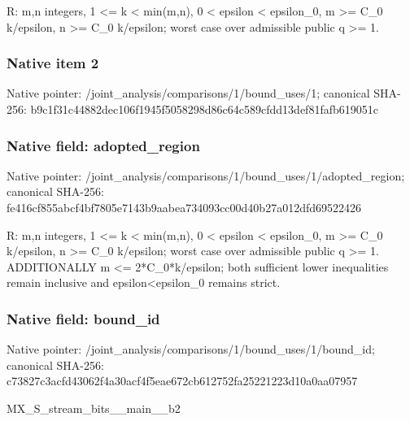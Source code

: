 \documentclass[10pt,a4paper]{article}
\begin{document}
\begingroup\raggedright\sloppy R:\allowbreak{} m,\allowbreak{}n integers,\allowbreak{} 1 <=\allowbreak{} k < min(m,\allowbreak{}n),\allowbreak{} 0 < epsilon < epsilon\_\allowbreak{}0,\allowbreak{} m >=\allowbreak{} C\_\allowbreak{}0 k/\allowbreak{}epsilon,\allowbreak{} n >=\allowbreak{} C\_\allowbreak{}0 k/\allowbreak{}epsilon;\allowbreak{} worst case over admissible public q >=\allowbreak{} 1.\par\endgroup

\subsubsection{Native item 2}
Native pointer: /joint\_\allowbreak{}analysis/comparisons/1/bound\_\allowbreak{}uses/1; canonical SHA-256: b9c1f31c44882dec106f1945f5058298d86c64c589cfdd13def81fafb619051c

\subsubsection{Native field: adopted\_\allowbreak{}region}
Native pointer: /joint\_\allowbreak{}analysis/comparisons/1/bound\_\allowbreak{}uses/1/adopted\_\allowbreak{}region; canonical SHA-256: fe416cf855abcf4bf7805e7143b9aabea734093cc00d40b27a012dfd69522426

\begingroup\raggedright\sloppy R:\allowbreak{} m,\allowbreak{}n integers,\allowbreak{} 1 <=\allowbreak{} k < min(m,\allowbreak{}n),\allowbreak{} 0 < epsilon < epsilon\_\allowbreak{}0,\allowbreak{} m >=\allowbreak{} C\_\allowbreak{}0 k/\allowbreak{}epsilon,\allowbreak{} n >=\allowbreak{} C\_\allowbreak{}0 k/\allowbreak{}epsilon;\allowbreak{} worst case over admissible public q >=\allowbreak{} 1. ADDITIONALLY m <=\allowbreak{} 2*C\_\allowbreak{}0*k/\allowbreak{}epsilon;\allowbreak{} both sufficient lower inequalities remain inclusive and epsilon<epsilon\_\allowbreak{}0 remains strict.\par\endgroup

\subsubsection{Native field: bound\_\allowbreak{}id}
Native pointer: /joint\_\allowbreak{}analysis/comparisons/1/bound\_\allowbreak{}uses/1/bound\_\allowbreak{}id; canonical SHA-256: c73827c3acfd43062f4a30acf4f5eae672cb612752fa25221223d10a0aa07957

\begingroup\raggedright\sloppy MX\_\allowbreak{}S\_\allowbreak{}stream\_\allowbreak{}bits\_\allowbreak{}\_\allowbreak{}main\_\allowbreak{}\_\allowbreak{}b2\par\endgroup
\end{document}
